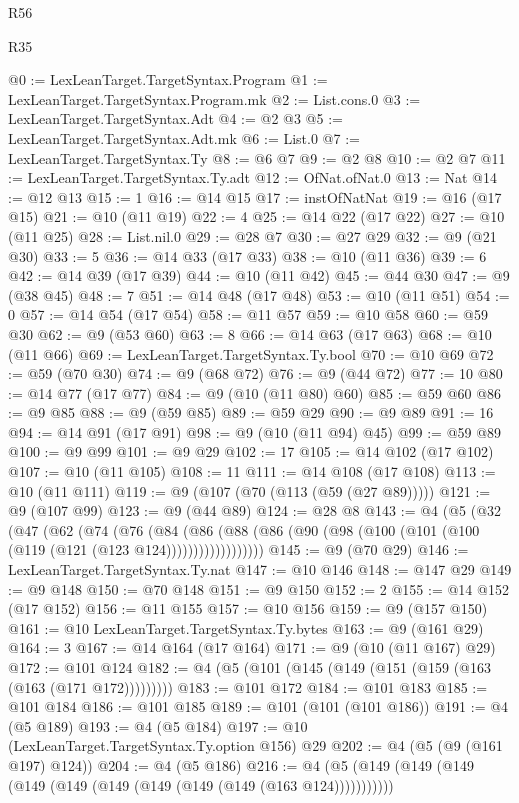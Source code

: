 \begin{lexlean}{R56}
\begin{lexlean}{R35}
\begin{coremodule}
{{{{{{{{{{{{{{{{{{{{{{{{{{{{{{{{{{{{{{{{{{{{{{{{{{{{@0 := LexLeanTarget.TargetSyntax.Program
@1 := LexLeanTarget.TargetSyntax.Program.mk
@2 := List.cons.{0}
@3 := LexLeanTarget.TargetSyntax.Adt
@4 := @2 @3
@5 := LexLeanTarget.TargetSyntax.Adt.mk
@6 := List.{0}
@7 := LexLeanTarget.TargetSyntax.Ty
@8 := @6 @7
@9 := @2 @8
@10 := @2 @7
@11 := LexLeanTarget.TargetSyntax.Ty.adt
@12 := OfNat.ofNat.{0}
@13 := Nat
@14 := @12 @13
@15 := 1
@16 := @14 @15
@17 := instOfNatNat
@19 := @16 (@17 @15)
@21 := @10 (@11 @19)
@22 := 4
@25 := @14 @22 (@17 @22)
@27 := @10 (@11 @25)
@28 := List.nil.{0}
@29 := @28 @7
@30 := @27 @29
@32 := @9 (@21 @30)
@33 := 5
@36 := @14 @33 (@17 @33)
@38 := @10 (@11 @36)
@39 := 6
@42 := @14 @39 (@17 @39)
@44 := @10 (@11 @42)
@45 := @44 @30
@47 := @9 (@38 @45)
@48 := 7
@51 := @14 @48 (@17 @48)
@53 := @10 (@11 @51)
@54 := 0
@57 := @14 @54 (@17 @54)
@58 := @11 @57
@59 := @10 @58
@60 := @59 @30
@62 := @9 (@53 @60)
@63 := 8
@66 := @14 @63 (@17 @63)
@68 := @10 (@11 @66)
@69 := LexLeanTarget.TargetSyntax.Ty.bool
@70 := @10 @69
@72 := @59 (@70 @30)
@74 := @9 (@68 @72)
@76 := @9 (@44 @72)
@77 := 10
@80 := @14 @77 (@17 @77)
@84 := @9 (@10 (@11 @80) @60)
@85 := @59 @60
@86 := @9 @85
@88 := @9 (@59 @85)
@89 := @59 @29
@90 := @9 @89
@91 := 16
@94 := @14 @91 (@17 @91)
@98 := @9 (@10 (@11 @94) @45)
@99 := @59 @89
@100 := @9 @99
@101 := @9 @29
@102 := 17
@105 := @14 @102 (@17 @102)
@107 := @10 (@11 @105)
@108 := 11
@111 := @14 @108 (@17 @108)
@113 := @10 (@11 @111)
@119 := @9 (@107 (@70 (@113 (@59 (@27 @89)))))
@121 := @9 (@107 @99)
@123 := @9 (@44 @89)
@124 := @28 @8
@143 := @4
    (@5
      (@32
        (@47
          (@62
            (@74
              (@76
                (@84
                  (@86
                    (@88 (@86 (@90 (@98 (@100 (@101 (@100 (@119 (@121 (@123 @124))))))))))))))))))
@145 := @9 (@70 @29)
@146 := LexLeanTarget.TargetSyntax.Ty.nat
@147 := @10 @146
@148 := @147 @29
@149 := @9 @148
@150 := @70 @148
@151 := @9 @150
@152 := 2
@155 := @14 @152 (@17 @152)
@156 := @11 @155
@157 := @10 @156
@159 := @9 (@157 @150)
@161 := @10 LexLeanTarget.TargetSyntax.Ty.bytes
@163 := @9 (@161 @29)
@164 := 3
@167 := @14 @164 (@17 @164)
@171 := @9 (@10 (@11 @167) @29)
@172 := @101 @124
@182 := @4 (@5 (@101 (@145 (@149 (@151 (@159 (@163 (@163 (@171 @172)))))))))
@183 := @101 @172
@184 := @101 @183
@185 := @101 @184
@186 := @101 @185
@189 := @101 (@101 (@101 @186))
@191 := @4 (@5 @189)
@193 := @4 (@5 @184)
@197 := @10 (LexLeanTarget.TargetSyntax.Ty.option @156) @29
@202 := @4 (@5 (@9 (@161 @197) @124))
@204 := @4 (@5 @186)
@216 := @4 (@5 (@149 (@149 (@149 (@149 (@149 (@149 (@149 (@149 (@149 (@163 @124)))))))))))
}}}}}}}}}}}}}}}}}}}}}}}}}}}}}}}}}}}}}}}}}}}}}}}}}}}}
\end{coremodule}
\end{lexlean}
\end{lexlean}
